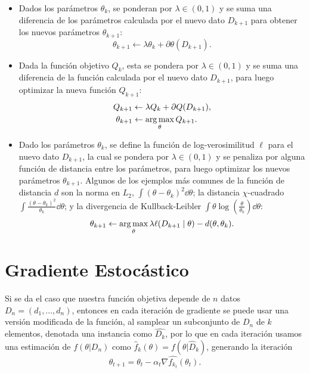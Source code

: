 \begin{itemize}
	\item Dados los parámetros \(\theta_k\), se ponderan por \(\lambda \in (0, 1)\) y se suma una diferencia de los parámetros calculada por el nuevo dato \(D_{k+1}\) para obtener los nuevos parámetros \(\theta_{k+1}\):
	\begin{equation*}
	\theta_{k+1} \gets \lambda \theta_k + \partial \theta (D_{k+1}).
	\end{equation*}
	\item Dada la función objetivo \(Q_k\), esta se pondera por \(\lambda \in (0, 1)\) y se suma una diferencia de la función calculada por el nuevo dato \(D_{k+1}\), para luego optimizar la nueva función \(Q_{k+1}\):
	\begin{align*}
	Q_{k+1}			& \gets \lambda Q_k + \partial Q(D_{k+1}),\\
	\theta_{k+1}	& \gets \operatorname*{\arg\max}_{\theta} Q_{k+1}.
	\end{align*}
	\item Dado los parámetros \(\theta_k\), se define la función de log-verosimilitud \(\ell\) para el nuevo dato \(D_{k+1}\), la cual se pondera por \(\lambda \in (0, 1)\) y se penaliza por alguna función de distancia entre los parámetros, para luego optimizar los nuevos parámetros \(\theta_{k+1}\). Algunos de los ejemplos más comunes de la función de distancia \(d\) son la norma en \(L_2\), \(\int (\theta - \theta_k)^2 \dd{\theta}\); la distancia \(\chi\)-cuadrado \(\int \frac{(\theta - \theta_k)^2}{\theta_k} \dd{\theta}\); y la divergencia de Kullback-Leibler \(\int \theta \log (\frac{\theta}{\theta_k}) \dd{\theta}\):
	\begin{equation*}
	\theta_{k+1} \gets \operatorname*{\arg\max}_{\theta} \lambda \ell (D_{k+1} \mid \theta) - d(\theta, \theta_k).
	\end{equation*}
\end{itemize}



\section{Gradiente Estocástico}

Si se da el caso que nuestra función objetiva depende de \(n\) datos \(D_n = (d_1,...,d_n)\), entonces en cada iteración de gradiente se puede usar una versión modificada de la función, al samplear un subconjunto de \(D_n\) de \(k\) elementos, denotada una instancia como \(\hat{D_k}\), por lo que en cada iteración usamos una estimación de \(f(\theta\lvert D_n)\) como \(\hat{f}_k(\theta) = f(\theta\lvert \hat{D}_k)\), generando la iteración \[\theta_{t+1} = \theta_t - \alpha_t \nabla \hat{f_{k_t}}(\theta_t).\]

